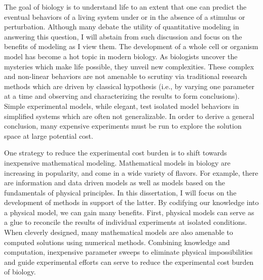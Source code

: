 
\par The goal of biology is to understand life to an extent that one can predict the eventual behaviors of a living system under or in the absence of a stimulus or perturbation.
Although many debate the utility of quantitative modeling in answering this question, I will abstain from such discussion and focus on the benefits of modeling as I view them.
The development of a whole cell or organism model has become a hot topic in modern biology.
As biologists uncover the mysteries which make life possible, they unveil new complexities\cite{CheckHayden2010}.
These complex and non-linear behaviors are not amenable to scrutiny via traditional research methods which are driven by classical hypothesis (i.e., by varying one parameter at a time and observing and characterizing the results to form conclusions).
Simple experimental models, while elegant, test isolated model behaviors in simplified systems which are often not generalizable.
In order to derive a general conclusion, many expensive experiments must be run to explore the solution space at large potential cost.

\par One strategy to reduce the experimental cost burden is to shift towards inexpensive mathematical modeling.
Mathematical models in biology are increasing in popularity, and come in a wide variety of flavors\cite{Gunawardena2014}.
For example, there are information and data driven models as well as models based on the fundamentals of physical principles.
In this dissertation, I will focus on the development of methods in support of the latter.
By codifying our knowledge into a physical model, we can gain many benefits.
First, physical models can serve as a glue to reconcile the results of individual experiments at isolated conditions.
When cleverly designed, many mathematical models are also amenable to computed solutions using numerical methods.
Combining knowledge and computation, inexpensive parameter sweeps to eliminate physical impossibilities and guide experimental efforts can serve to reduce the experimental cost burden of biology.

